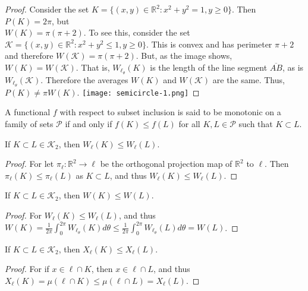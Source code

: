 \documentclass[crop=false,class=article,oneside]{standalone}
\begin{document}
        \begin{proof}
        Consider the set $K = \{(x,y) \in \mathbb{R}^2: x^2+y^2=1, y\geq 0\}$. Then $P(K) = 2\pi$, but \\ $W(K) = \pi(\pi+2)$. To see this, consider the set $\mathcal{K} = \{(x,y)\in \mathbb{R}^2: x^2 + y^2 \leq 1, y\geq 0\}$. This is convex and has perimeter $\pi+2$ and therefore $W(\mathcal{K}) = \pi(\pi+2)$. But, as the image shows, $W(K) = W(\mathcal{K})$. That is, $W_{\ell_{\theta}}(K)$ is the length of the line segment $\overline{AB}$, as is $W_{\ell_{\theta}}(\mathcal{K})$. Therefore the averages $W(K)$ and $W(\mathcal{K})$ are the same. Thus, $P(K) \ne \pi W(K)$.
        \texttt{[image: semicircle-1.png]}
        \end{proof}
        \begin{definition}
        A functional $f$ with respect to subset inclusion is said to be monotonic on a family of sets $\mathscr{P}$ if and only if $f(K)\leq f(L)$ for all $K,L \in \mathscr{P}$ such that $K\subset L$.
        \end{definition}
        \begin{theorem}
        If $K\subset L \in \mathscr{K}_2$, then $W_{\ell}(K) \leq W_{\ell}(L)$.
        \end{theorem}
        \begin{proof}
        For let $\pi_{\ell}:\mathbb{R}^2 \rightarrow \ell$ be the orthogonal projection map of $\mathbb{R}^2$ to $\ell$. Then $\pi_{\ell}(K)\leq \pi_{\ell}(L)$ as $K\subset L$, and thus $W_{\ell}(K)\leq W_{\ell}(L)$.
        \end{proof}
        \begin{theorem}
        If $K\subset L\in \mathscr{K}_2$, then $W(K)\leq W(L)$.
        \end{theorem}
        \begin{proof}
        For $W_{\ell}(K)\leq W_{\ell}(L)$, and thus $W(K)=\frac{1}{2\pi}\int_{0}^{2\pi}W_{\ell_{\theta}}(K)d\theta \leq \frac{1}{2\pi}\int_{0}^{2\pi}W_{\ell_{\theta}}(L)d\theta=W(L)$.
        \end{proof}
        \begin{theorem}
        If $K\subset L\in \mathscr{K}_2$, then $X_{\ell}(K)\leq X_{\ell}(L)$.
        \end{theorem}
        \begin{proof}
        For if $x\in \ell\cap K$, then $x\in \ell\cap L$, and thus $X_{\ell}(K)=\mu(\ell\cap K) \leq \mu(\ell\cap L)=X_{\ell}(L)$.
        \end{proof}
\end{document}
